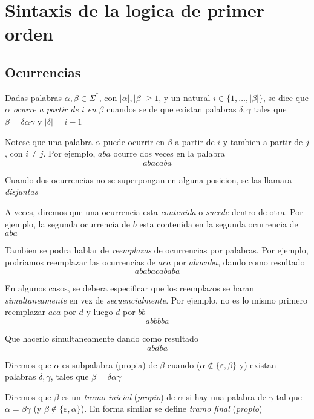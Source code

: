 
\section{Sintaxis de la logica de primer orden}

\subsection{Ocurrencias}

\begin{definition}
  Dadas palabras $\alpha, \beta \in \Sigma^*$, con $|\alpha|, |\beta| \geq 1$, y un natural $i \in \{1, \dots, |\beta|\}$,
  se dice que $\alpha$ \emph{ocurre a partir de $i$ en} $\beta$ cuandos se de que existan palabras $\delta, \gamma$ tales que
  $\beta = \delta\alpha\gamma$ y $|\delta| = i - 1$

  Notese que una palabra $\alpha$ puede ocurrir en $\beta$ a partir de $i$ y tambien a partir de $j$, con $i \neq j$. Por ejemplo, $aba$ ocurre dos veces en la palabra
  $$abacaba$$

  Cuando dos ocurrencias no se superpongan en alguna posicion, se las llamara \emph{disjuntas}

  A veces, diremos que una ocurrencia esta \emph{contenida} o \emph{sucede} dentro de otra. Por ejemplo,
  la segunda ocurrencia de $b$ esta contenida en la segunda ocurrencia de $aba$ 

  Tambien se podra hablar de \emph{reemplazos} de ocurrencias por palabras. Por ejemplo, podriamos reemplazar las ocurrencias de $aca$ por $abacaba$, dando como resultado
  $$ ababacababa$$
  
  En algunos casos, se debera especificar
  que los reemplazos se haran \emph{simultaneamente} en vez de \emph{secuencialmente}. Por ejemplo, no es lo mismo primero reemplazar $aca$ por $d$ y luego $d$ por $bb$
  $$abbbba$$

  Que hacerlo simultaneamente dando como resultado
  $$abdba$$
\end{definition}

\begin{definition}
  Diremos que $\alpha$ es subpalabra (propia) de $\beta$ cuando ($\alpha \notin \{\varepsilon, \beta \}$ y) existan palabras
  $\delta, \gamma$, tales que $\beta = \delta\alpha\gamma$ 
\end{definition}

\begin{definition}
  Diremos que $\beta$ es un \emph{tramo inicial} (\emph{propio}) de $\alpha$ si hay una palabra de $\gamma$ tal que $\alpha = \beta\gamma$ (y $\beta \notin \{\varepsilon, \alpha\}$).
  En forma similar se define \emph{tramo final} (\emph{propio})
\end{definition}

